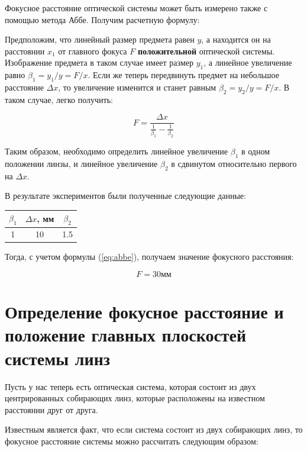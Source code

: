 \documentclass[a4paper, 12pt]{article}
\begin{document}
Фокусное расстояние оптической системы может быть измерено также с помощью метода Аббе. Получим расчетную формулу:

Предположим, что линейный размер предмета равен $y$, а находится он на расстоянии $x_1$ от главного фокуса $F$ \textbf{положительной} оптической системы. Изображение предмета в таком случае имеет размер $y_1$, а линейное увеличение равно $\beta_1 = y_1 / y = F / x$. Если же теперь передвинуть предмет на небольшое расстояние $\Delta x$, то увеличение изменится и станет равным $\beta_2 = y_2 / y = F / x$. В таком случае, легко получить:

\begin{equation}
	F = \frac{\Delta x}{\frac{1}{\beta_1} - \frac{1}{\beta_2}}
	\label{eq:abbe}
\end{equation}

Таким образом, необходимо определить линейное увеличение $\beta_1$ в одном положении линзы, и линейное увеличение $\beta_2$ в сдвинутом относительно первого на $\Delta x$.

В результате экспериментов были полученные следующие данные:

\begin{center}
	\begin{tabular}{|c|c|c|}
		\hline
		$\beta_1$ & $\Delta x$, мм & $\beta_2$ \\
		\hline
		1 & 10 & 1.5 \\
		\hline
	\end{tabular}
\end{center}

Тогда, с учетом формулы (\ref{eq:abbe}), получаем значение фокусного расстояния:

\begin{equation*} %
	\boxed{
	F = 30 \text{мм}}
\end{equation*}

\section{Определение фокусное расстояние и положение главных плоскостей системы линз}

Пусть у нас теперь есть оптическая система, которая состоит из двух центрированных собирающих линз, которые расположены на известном расстоянии друг от друга. 

Известным является факт, что если система состоит из двух собирающих линз, то фокусное расстояние системы можно рассчитать следующим образом:
\end{document}
